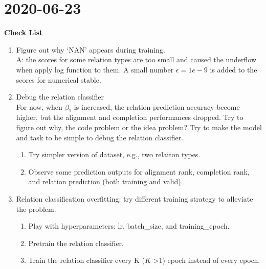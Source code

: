 \chapter{2020-06-23}

\textbf{Check List}
\begin{enumerate}
    \item \faCheckSquareO Figure out why `NAN' appears during training. \\
        A: the scores for some relation types are too small and caused the underflow when apply log function to them. A small number $\epsilon =1e-9$ is added to the scores for numerical stable.
    \item Debug the relation classifier \\
    For now, when $\beta_1$ is increased, the relation prediction accuracy become higher, but the alignment and completion performances dropped.  Try to figure out why, the code problem or the idea problem?
    Try to make the model and task to be simple to debug the relation classifier. 
    \begin{enumerate}
        \item \faCheckSquareO Try simpler version of dataset, e.g., two relaiton types.
        \item Observe some prediction outputs for alignment rank, completion rank, and relation prediction (both training and valid). 
    \end{enumerate}
    
    \item Relation classification overfitting: try different training strategy to alleviate the problem. 
    \begin{enumerate}
        \item \faCheckSquareO Play with hyperparameters: lr, batch\_size, and training\_epoch. 
        \item \faCheckSquareO Pretrain the relation classifier.
        \item \faCheckSquareO Train the relation classifier every K ($K$ \textgreater $1$) epoch instead of every epoch. 
    \end{enumerate}
\end{enumerate}

